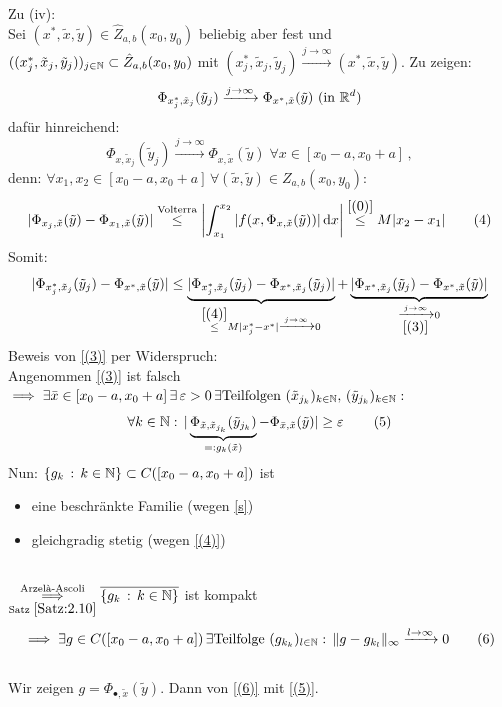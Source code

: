 \documentclass[a4paper]{article}
\begin{document}
\begin{Beweis}
Zu (iv):\\
 Sei $(x^*,\tilde{x},\tilde{y})\in \hat{Z}_{a,b}(x_0,y_0)$ beliebig aber fest und $((x_j^*,\tilde{x}_j,\tilde{y}_j))_{j\in\operatorname{\mathbb N}}\subset \hat{Z}_{a,b}(x_0,y_0)$ mit $(x_j^*,\tilde{x}_j,\tilde{y}_j)\xrightarrow{j\to\infty}(x^*,\tilde{x},\tilde{y})$. Zu zeigen:
\[\Phi_{x_j^*,\tilde{x}_j}(\tilde{y}_j)\xrightarrow{j\to\infty}\Phi_{x^*,\tilde{x}}(\tilde{y})\text{ (in $\mathbb R^d$)}\]
dafür hinreichend:
\[\Phi_{x,\tilde{x}_j}(\tilde{y}_j)\xrightarrow{j\to\infty}\Phi_{x,\tilde{x}}(\tilde{y})\;\forall x\in[x_0-a,x_0+a]\,,\tag{$3$}\label{(3)}\]
denn: $\forall x_1,x_2\in [x_0-a,x_0+a]\,\forall (\tilde{x},\tilde{y})\in Z_{a,b}(x_0,y_0):$
\[|\Phi_{x_j,\tilde{x}}(\tilde{y})-\Phi_{x_1,\tilde{x}}(\tilde{y})|
\overset{\text{Volterra}}{\le}\left|\int_{x_1}^{x_2}|f(x,\Phi_{x,\tilde{x}}(\tilde{y}))|\mathop{}\!\mathrm{d} x\right|
\overset{\eqref{(0)}}{\le }M|x_2-x_1|\tag{$4$}\label{(4)}
\]
Somit:
\[|\Phi_{x_j^*,\tilde{x}_j}(\tilde{y}_j)-\Phi_{x^*,\tilde{x}}(\tilde{y})|\le
\underbrace{|\Phi_{x_j^*,\tilde{x}_j}(\tilde{y}_j)-\Phi_{x^*,\tilde{x}_j}(\tilde{y}_j)|}_{\overset{\eqref{(4)}}{\le }M|x_j^*-x^*|\xrightarrow{j\to\infty}0}
+\underbrace{|\Phi_{x^*,\tilde{x}_j}(\tilde{y}_j)-\Phi_{x^*,\tilde{x}}(\tilde{y})|}_{\xrightarrow[\eqref{(3)}]{j\to\infty}0}
\]
Beweis von \eqref{(3)} per Widerspruch:\\
Angenommen \eqref{(3)} ist falsch $\implies \exists \bar{x}\in[x_0-a,x_0+a]\,\exists\operatorname{\varepsilon}>0\,\exists \text{Teilfolgen }(\tilde{x}_{j_k})_{k\in\operatorname{\mathbb N}},\,(\tilde{y}_{j_k})_{k\in\operatorname{\mathbb N}}:$
\[\forall k\in\operatorname{\mathbb N}:\,|\underbrace{\Phi_{\tilde{x},\tilde{x}_{j_k}}(\tilde{y}_{j_k})}_{=:g_k(\tilde{x})}-\Phi_{\bar{x},\tilde{x}}(\tilde{y})|\ge \operatorname{\varepsilon}\tag{$5$}\label{(5)}\]
Nun: $\{g_k\,:\,k\in\operatorname{\mathbb N}\}\subset C([x_0-a,x_0+a])$ ist
\begin{minipage}[t]{0.5\textwidth}
\begin{itemize}
\item eine beschränkte Familie (wegen \eqref{s})
\item gleichgradig stetig (wegen \eqref{(4)})
\end{itemize}
\end{minipage}\\
$\overset{\text{Arzel\`{a}-Ascoli}}{\underset{\text{Satz }\ref{Satz:2.10}}{\implies}}\overline{\{g_k\,:\,k\in\operatorname{\mathbb N}\}}$ ist kompakt
\[\implies\exists g\in C([x_0-a,x_0+a])\,\exists \text{Teilfolge }(g_{k_k})_{l\in\operatorname{\mathbb N}}:\, \|g-g_{k_l}\|_{\infty}\xrightarrow{l\to\infty}0\tag{$6$}\label{(6)}\]
\ \\
Wir zeigen $g=\Phi_{\bullet,\tilde{x}}(\tilde{y})$. Dann \lightning von \eqref{(6)} mit \eqref{(5)}.\\

\end{Beweis}
\end{document}
